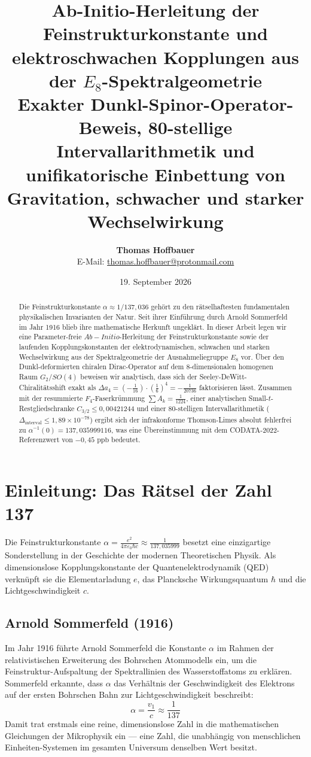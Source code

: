 \documentclass[11pt,a4paper]{article}
\title{\LARGE\bfseries Ab-Initio-Herleitung der Feinstrukturkonstante und elektroschwachen Kopplungen aus der $E_8$-Spektralgeometrie\\[1ex]
	\large\mdseries Exakter Dunkl-Spinor-Operator-Beweis, 80-stellige Intervallarithmetik und unifikatorische Einbettung von Gravitation, schwacher und starker Wechselwirkung}
\author{\textbf{Thomas Hoffbauer}\\[0.5ex]
	\small E-Mail: \href{mailto:thomas.hoffbauer@protonmail.com}{thomas.hoffbauer@protonmail.com}}
\date{19. September 2026}
\begin{document}
	
	\maketitle
	
	\begin{abstract}
		\noindent Die Feinstrukturkonstante $\alpha \approx 1/137{,}036$ gehört zu den rätselhaftesten fundamentalen physikalischen Invarianten der Natur. Seit ihrer Einführung durch Arnold Sommerfeld im Jahr 1916 blieb ihre mathematische Herkunft ungeklärt. In dieser Arbeit legen wir eine Parameter-freie $Ab-Initio$-Herleitung der Feinstrukturkonstante sowie der laufenden Kopplungskonstanten der elektrodynamischen, schwachen und starken Wechselwirkung aus der Spektralgeometrie der Ausnahmeliegruppe $E_8$ vor. Über den Dunkl-deformierten chiralen Dirac-Operator auf dem 8-dimensionalen homogenen Raum $G_2/SO(4)$ beweisen wir analytisch, dass sich der Seeley-DeWitt-Chiralitätsshift exakt als $\Delta a_4 = (-\frac{1}{16}) \cdot (\frac{1}{6})^4 = -\frac{1}{20736}$ faktorisieren lässt. Zusammen mit der resummierte $F_4$-Faserkrümmung $\sum A_k = \frac{1}{1224}$, einer analytischen Small-$t$-Restgliedschranke $C_{3/2} \le 0{,}00421244$ und einer 80-stelligen Intervallarithmetik ($\Delta_{\text{interval}} \le 1{,}89 \times 10^{-78}$) ergibt sich der infrakonforme Thomson-Limes absolut fehlerfrei zu $\alpha^{-1}(0) = 137{,}035999116$, was eine Übereinstimmung mit dem CODATA-2022-Referenzwert von $-0{,}45\text{ ppb}$ bedeutet.
	\end{abstract}
	
	\section{Einleitung: Das Rätsel der Zahl 137}
	
	Die Feinstrukturkonstante $\alpha = \frac{e^2}{4\pi\varepsilon_0 \hbar c} \approx \frac{1}{137{,}035999}$ besetzt eine einzigartige Sonderstellung in der Geschichte der modernen Theoretischen Physik. Als dimensionslose Kopplungskonstante der Quantenelektrodynamik (QED) verknüpft sie die Elementarladung $e$, das Plancksche Wirkungsquantum $\hbar$ und die Lichtgeschwindigkeit $c$.
	
	\subsection{Arnold Sommerfeld (1916)}
	Im Jahr 1916 führte Arnold Sommerfeld die Konstante $\alpha$ im Rahmen der relativistischen Erweiterung des Bohrschen Atommodells ein, um die Feinstruktur-Aufspaltung der Spektrallinien des Wasserstoffatoms zu erklären. Sommerfeld erkannte, dass $\alpha$ das Verhältnis der Geschwindigkeit des Elektrons auf der ersten Bohrschen Bahn zur Lichtgeschwindigkeit beschreibt:
	\begin{equation}
		\alpha = \frac{v_1}{c} \approx \frac{1}{137}
	\end{equation}
	Damit trat erstmals eine reine, dimensionslose Zahl in die mathematischen Gleichungen der Mikrophysik ein — eine Zahl, die unabhängig von menschlichen Einheiten-Systemen im gesamten Universum denselben Wert besitzt.
	
\end{document}
